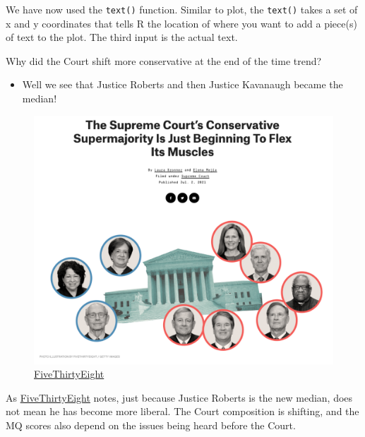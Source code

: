 \documentclass[
  letterpaper,
  DIV=11,
  numbers=noendperiod]{scrreprt}
\providecommand{\tightlist}{%
  \setlength{\itemsep}{0pt}\setlength{\parskip}{0pt}}\usepackage{longtable,booktabs,array}
\begin{document}
We have now used the \texttt{text()} function. Similar to plot, the
\texttt{text()} takes a set of x and y coordinates that tells R the
location of where you want to add a piece(s) of text to the plot. The
third input is the actual text.

Why did the Court shift more conservative at the end of the time trend?

\begin{itemize}
\tightlist
\item
  Well we see that Justice Roberts and then Justice Kavanaugh became the
  median!
\end{itemize}

\begin{figure}

{\centering \includegraphics{images/sccourt3.png}

}

\caption{\href{https://fivethirtyeight.com/features/the-supreme-courts-conservative-supermajority-is-just-beginning-to-flex-its-muscles}{FiveThirtyEight}}

\end{figure}

As
\href{https://fivethirtyeight.com/features/roberts-is-the-new-swing-justice-that-doesnt-mean-hes-becoming-more-liberal/}{FiveThirtyEight}
notes, just because Justice Roberts is the new median, does not mean he
has become more liberal. The Court composition is shifting, and the MQ
scores also depend on the issues being heard before the Court.
\end{document}
